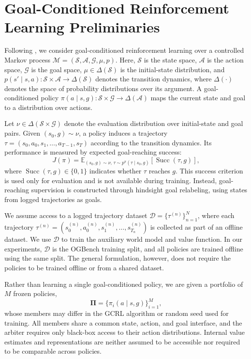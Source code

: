 \documentclass{article}
\theoremstyle{plain}
\theoremstyle{definition}
\theoremstyle{plain}
\newcommand{\PiBank}{\boldsymbol{\Pi}}
\newcommand{\calD}{\mathcal{D}}
\newcommand{\calS}{\mathcal{S}}
\newcommand{\calA}{\mathcal{A}}
\newcommand{\calG}{\mathcal{G}}
\begin{document}
\section{Goal-Conditioned Reinforcement Learning Preliminaries}
\label{sec:prelim}
Following \citet{park2025ogbench}, we consider goal-conditioned reinforcement learning over a controlled Markov process
$\mathcal{M}=(\calS,\calA,\calG,\mu,p)$.
Here, $\calS$ is the state space, $\calA$ is the action space, $\calG$ is the goal space, $\mu\in\Delta(\calS)$ is the initial-state distribution, and $p(s'\mid s,a)\colon\calS\times\calA\to\Delta(\calS)$ denotes the transition dynamics, where $\Delta(\cdot)$ denotes the space of probability distributions over its argument. A goal-conditioned policy $\pi(a\mid s,g)\colon\calS\times\calG\to\Delta(\calA)$ maps the current state and goal to a distribution over actions.

Let $\nu\in\Delta(\calS\times\calG)$ denote the evaluation distribution over initial-state and goal pairs. Given $(s_0,g)\sim\nu$, a policy induces a trajectory $\tau=(s_0,a_0,s_1,\ldots,a_{T-1},s_T)$ according to the transition dynamics. Its performance is measured by expected goal-reaching success:
\[
    J(\pi)
    =
    \mathbb{E}_{(s_0,g)\sim\nu,\,
    \tau\sim p^\pi(\tau\mid s_0,g)}
    \left[\operatorname{Succ}(\tau,g)\right],
\]
where $\operatorname{Succ}(\tau,g)\in\{0,1\}$ indicates whether $\tau$
reaches $g$. This success criterion is used only for evaluation and is not available during training. Instead, goal-reaching supervision is constructed through hindsight goal relabeling, using states from logged trajectories as goals.

We assume access to a logged trajectory dataset $\calD=\{\tau^{(n)}\}_{n=1}^N$, where each trajectory $\tau^{(n)}=(s_0^{(n)},a_0^{(n)},s_1^{(n)},\ldots,s_{T_n}^{(n)})$ is collected as part of an offline dataset. We use $\calD$ to train the auxiliary world model and value function. In our experiments, $\calD$ is the OGBench training split, and all policies are trained offline using the same split. The general formulation, however, does not require the policies to be trained offline or from a shared dataset.

Rather than learning a single goal-conditioned policy, we are given a portfolio of $M$ frozen policies,
\[
    \PiBank=\{\pi_i(a\mid s,g)\}_{i=1}^M,
\]
whose members may differ in the GCRL algorithm or random seed used for training. All members share a common state, action, and goal interface, and the arbiter requires only black-box access to their action distributions. Internal value estimates and representations are neither assumed to be accessible nor required to be comparable across policies.
\end{document}
